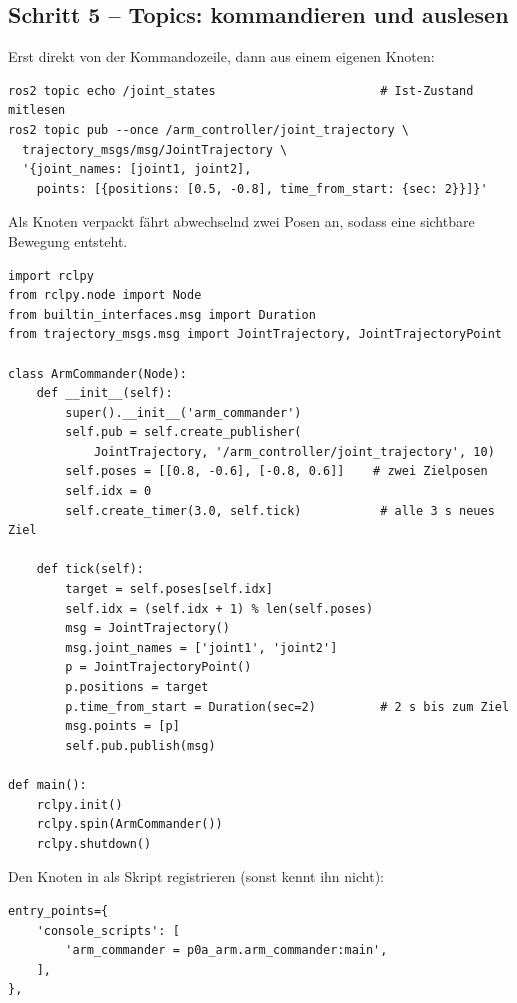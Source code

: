 \subsection{Schritt 5 -- Topics: kommandieren und auslesen}
Erst direkt von der Kommandozeile, dann aus einem eigenen Knoten:
\begin{lstlisting}[style=bash,caption={Gelenke per Topic ansprechen}]
ros2 topic echo /joint_states                       # Ist-Zustand mitlesen
ros2 topic pub --once /arm_controller/joint_trajectory \
  trajectory_msgs/msg/JointTrajectory \
  '{joint_names: [joint1, joint2],
    points: [{positions: [0.5, -0.8], time_from_start: {sec: 2}}]}'
\end{lstlisting}
\noindent Als Knoten verpackt fährt \code{arm\_commander} abwechselnd zwei Posen
an, sodass eine sichtbare Bewegung entsteht.
\begin{lstlisting}[style=py,caption={\code{p0a\_arm/arm\_commander.py}}]
import rclpy
from rclpy.node import Node
from builtin_interfaces.msg import Duration
from trajectory_msgs.msg import JointTrajectory, JointTrajectoryPoint

class ArmCommander(Node):
    def __init__(self):
        super().__init__('arm_commander')
        self.pub = self.create_publisher(
            JointTrajectory, '/arm_controller/joint_trajectory', 10)
        self.poses = [[0.8, -0.6], [-0.8, 0.6]]    # zwei Zielposen
        self.idx = 0
        self.create_timer(3.0, self.tick)           # alle 3 s neues Ziel

    def tick(self):
        target = self.poses[self.idx]
        self.idx = (self.idx + 1) % len(self.poses)
        msg = JointTrajectory()
        msg.joint_names = ['joint1', 'joint2']
        p = JointTrajectoryPoint()
        p.positions = target
        p.time_from_start = Duration(sec=2)         # 2 s bis zum Ziel
        msg.points = [p]
        self.pub.publish(msg)

def main():
    rclpy.init()
    rclpy.spin(ArmCommander())
    rclpy.shutdown()
\end{lstlisting}
\noindent Den Knoten in  als Skript registrieren (sonst kennt
\code{ros2 run} ihn nicht):
\begin{lstlisting}[style=py,caption={\code{p0a\_arm/setup.py} -- \code{entry\_points}}]
entry_points={
    'console_scripts': [
        'arm_commander = p0a_arm.arm_commander:main',
    ],
},
\end{lstlisting}


